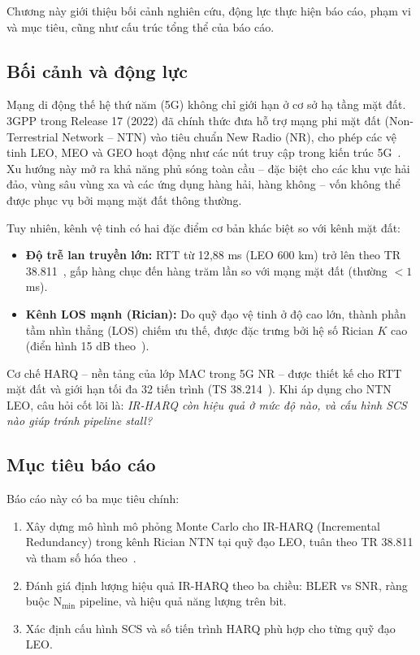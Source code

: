 Chương này giới thiệu bối cảnh nghiên cứu, động lực thực hiện báo cáo, phạm vi và mục tiêu, cũng như cấu trúc tổng thể của báo cáo.

\subsection{Bối cảnh và động lực}

Mạng di động thế hệ thứ năm (5G) không chỉ giới hạn ở cơ sở hạ tầng mặt đất. 3GPP trong Release 17 (2022) đã chính thức đưa hỗ trợ mạng phi mặt đất (Non-Terrestrial Network -- NTN) vào tiêu chuẩn New Radio (NR), cho phép các vệ tinh LEO, MEO và GEO hoạt động như các nút truy cập trong kiến trúc 5G~\cite{tr38821}. Xu hướng này mở ra khả năng phủ sóng toàn cầu -- đặc biệt cho các khu vực hải đảo, vùng sâu vùng xa và các ứng dụng hàng hải, hàng không -- vốn không thể được phục vụ bởi mạng mặt đất thông thường.

Tuy nhiên, kênh vệ tinh có hai đặc điểm cơ bản khác biệt so với kênh mặt đất:
\begin{itemize}
    \item \textbf{Độ trễ lan truyền lớn:} RTT từ 12{,}88 ms (LEO 600 km) trở lên theo TR 38.811~\cite{tr38811}, gấp hàng chục đến hàng trăm lần so với mạng mặt đất (thường $< 1$ ms).
    \item \textbf{Kênh LOS mạnh (Rician):} Do quỹ đạo vệ tinh ở độ cao lớn, thành phần tầm nhìn thẳng (LOS) chiếm ưu thế, được đặc trưng bởi hệ số Rician $K$ cao (điển hình 15 dB theo~\cite{tuninato2025}).
\end{itemize}

Cơ chế HARQ -- nền tảng của lớp MAC trong 5G NR -- được thiết kế cho RTT mặt đất và giới hạn tối đa 32 tiến trình (TS 38.214~\cite{ts38214}). Khi áp dụng cho NTN LEO, câu hỏi cốt lõi là: \textit{IR-HARQ còn hiệu quả ở mức độ nào, và cấu hình SCS nào giúp tránh pipeline stall?}

\subsection{Mục tiêu báo cáo}

Báo cáo này có ba mục tiêu chính:
\begin{enumerate}
    \item Xây dựng mô hình mô phỏng Monte Carlo cho IR-HARQ (Incremental Redundancy) trong kênh Rician NTN tại quỹ đạo LEO, tuân theo TR 38.811 và tham số hóa theo~\cite{tuninato2025}.
    \item Đánh giá định lượng hiệu quả IR-HARQ theo ba chiều: BLER vs SNR, ràng buộc N$_{\min}$ pipeline, và hiệu quả năng lượng trên bit.
    \item Xác định cấu hình SCS và số tiến trình HARQ phù hợp cho từng quỹ đạo LEO.
\end{enumerate}

